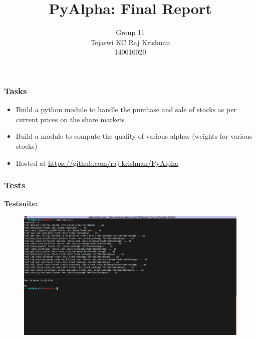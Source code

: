 \documentclass[serif,mathserif]{beamer}
\author[Tejaswi KC, Raj Krishnan]{Group 11 \\ Tejaswi KC \quad Raj Krishnan \\ 140010020 \quad 140010007}
\title[PyAlpha\hspace{2em}\insertframenumber/\inserttotalframenumber]{PyAlpha: Final Report}
\institute{Indian Institute of Technology, Bombay}
\begin{document}
    \maketitle

    \begin{frame}

        \frametitle{Tasks}

        \begin{itemize}
            \item Build a python module to handle the purchase and sale of stocks
                  as per current prices on the share markets
            \item Build a module to compute the quality of various alphas
                  (weights for various stocks)
            \item Hosted at \url{https://github.com/raj-krishnan/PyAlpha}
        \end{itemize}

    \end{frame}

    \begin{frame}

        \frametitle{Tests}
        
        \textbf{Testsuite:}
        \begin{figure}
            \centering
            \includegraphics[width = \linewidth]{testsuite.png}
        \end{figure}

    \end{frame}
    
\end{document}
